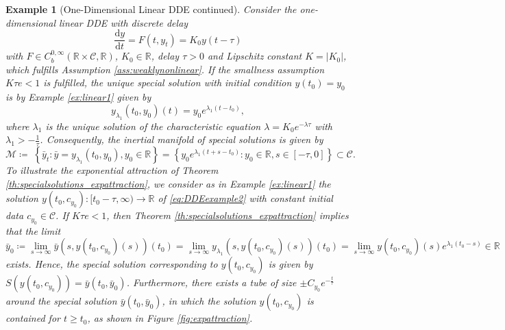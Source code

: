\documentclass[10pt]{article}
\numberwithin{equation}{section}
\newcommand*{\dd}{\mathrm{d}}
\newtheorem{example}[theorem]{Example}
\newcommand\abs[1]{\left\lvert#1\right\rvert}
\begin{document}
	\begin{example}[One-Dimensional Linear DDE continued]  \label{ex:linear2} \normalfont
		Consider the one-dimensional linear DDE with discrete delay
		\begin{equation} \label{eq:DDEexample2}
			\frac{\dd y}{\dd t} = F(t,y_t) = K_0 y(t-\tau)
		\end{equation}
		with $F\in C^{0,\infty}_b(\mathbb{R}\times \mathcal{C},\mathbb{R})$, $K_0 \in \mathbb{R}$, delay $\tau>0$ and Lipschitz constant $K = \abs{K_0}$, which fulfills Assumption \ref{ass:weaklynonlinear}.  If the smallness assumption $K\tau e<1$ is fulfilled, the unique special solution with initial condition $y(t_0) = y_0$ is by Example \ref{ex:linear1} given by
		\begin{equation*}
			y_{\lambda_1}(t_0,y_0)(t) = y_0e^{\lambda_1(t-t_0)},
		\end{equation*}
		where $\lambda_1$ is the unique solution of the characteristic equation $\lambda = K_0 e^{-\lambda \tau}$ with $\lambda_1 > - \frac{1}{\tau}$. Consequently, the inertial manifold of special solutions is given by
		\begin{equation*}
			\mathcal{M}\coloneqq \;\left\{\bar{y}_t: \bar{y} = 	y_{\lambda_1}(t_0,y_0), y_0 \in \mathbb{R} \right\} = \left\{y_0e^{\lambda_1(t+s-t_0)} : y_0 \in \mathbb{R}, s\in[-\tau,0] \right\} \subset \mathcal{C}.
		\end{equation*}
		To illustrate the exponential attraction of  Theorem \ref{th:specialsolutions_expattraction}, we consider as in Example \ref{ex:linear1} the solution $y(t_0,c_{y_0}):[t_0-\tau,\infty) \rightarrow \mathbb{R}$ of \eqref{eq:DDEexample2} with constant initial data $c_{y_0} \in \mathcal{C}$. If $K\tau e <1$, then Theorem \ref{th:specialsolutions_expattraction} implies that the limit
		\begin{equation*}
			\bar{y}_0 \coloneqq \lim_{s \rightarrow \infty} \bar{y}(s,y(t_0,c_{y_0})(s))(t_0) = \lim_{s \rightarrow \infty} 	y_{\lambda_1}(s,y(t_0,c_{y_0})(s))(t_0) = \lim_{s \rightarrow \infty} y(t_0,c_{y_0})(s) e^{\lambda_1 (t_0-s)} \in \mathbb{R}
		\end{equation*}
		exists. Hence, the special solution corresponding to $y(t_0,c_{y_0})$ is given by $S(y(t_0,c_{y_0})) = \bar{y}(t_0,\bar{y}_0)$. Furthermore, there exists a tube of size $\pm C_{y_0}e^{-\frac{t}{\tau}}$ around the special solution $\bar{y}(t_0,\bar{y}_0)$, in which the solution $y(t_0,c_{y_0})$ is contained for $t\geq t_0$, as shown in Figure \ref{fig:expattraction}.
	\end{example}
	
\end{document}
